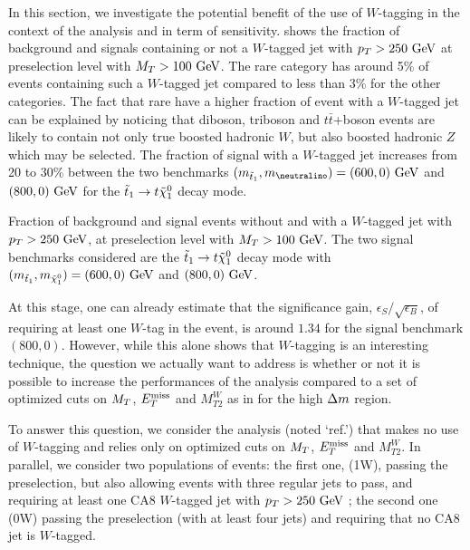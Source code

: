             In this section, we investigate the potential benefit of the use of $W$-tagging
            in the context of the analysis and in term of sensitivity. 
            shows the fraction of background and signals containing or not a $W$-tagged jet
            with $p_T > 250~\text{GeV}$ at preselection level with $M_T > 100~\text{GeV}$. The
            rare category has around 5\% of events containing such a $W$-tagged jet compared
            to less than 3\% for the other categories. The fact that rare have a higher
            fraction of event with a $W$-tagged jet can be explained by noticing that
            diboson, triboson and $t\bar{t}$+boson events are likely to contain not only
            true boosted hadronic $W$, but also boosted hadronic $Z$ which may be selected.
            The fraction of signal with a $W$-tagged jet increases from 20 to 30\% between
            the two benchmarks $(\mass{\lstop},\mass{\neutralino}) = (600,0) \GeV$ and
            $(800,0) ~\text{GeV}$ for the $\tilde{t}_1 \rightarrow t \tilde{\chi}_1^0$ decay mode.

                         {Fraction of background and signal events without and with a
                         $W$-tagged jet with $p_T > 250~\text{GeV}$, at preselection level with
                         $M_T > 100~\text{GeV}$. The two signal benchmarks considered are the $\tilde{t}_1
                         \rightarrow t \tilde{\chi}_1^0$ decay mode with
                         $(m_{\tilde{t}_1},m_{\tilde{\chi}_1^0}) = (600,0)~\text{GeV}$ and $(800,0)~\text{GeV}$.}

            At this stage, one can already estimate that the significance gain, $\epsilon_S / \sqrt{\epsilon_B}$,
            of requiring at least one $W$-tag in the event, is around $1.34$ for the
            signal benchmark $(800,0)$. However, while this alone shows that $W$-tagging
            is an interesting technique, the question we actually want to address is whether or not
            it is possible to increase the performances of the analysis compared to a set
            of optimized cuts on $M_T$, $E_T^\text{miss}$ and $M_{T2}^{W}$ as in
             for the high $\Delta m$ region.

            To answer this question, we consider the analysis (noted `ref.') that makes
            no use of $W$-tagging
            and relies only on optimized cuts on $M_T$, $E_T^\text{miss}$ and $M_{T2}^{W}$. In parallel,
            we consider two populations of events: the first one, (1W), passing the preselection,
            but also allowing events with three regular jets to pass, and requiring at least
            one CA8 $W$-tagged jet with $p_T > 250~\text{GeV}$ ; the second one (0W) passing the
            preselection (with at least four jets) and requiring that no CA8 jet is $W$-tagged.

